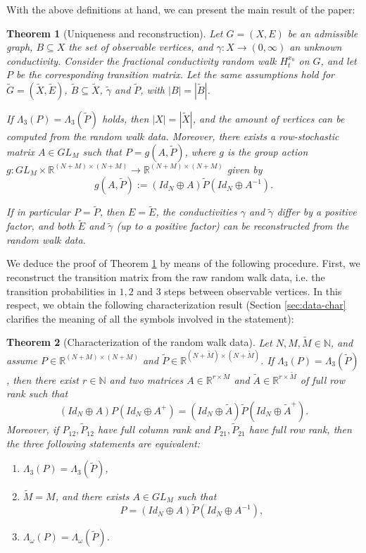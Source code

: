 \documentclass[a4paper,11pt,oneside]{amsart}
\newtheorem{theorem}{Theorem}[section]
\newcommand{\R}{{\mathbb R}}
\newcommand{\N}{{\mathbb N}}
\begin{document}
With the above definitions at hand, we can present the main result of the paper:

\begin{theorem}[Uniqueness and reconstruction]\label{th:main}
    Let $G=(X,E)$ be an admissible graph, $B\subseteq X$ the set of observable vertices, and $\gamma : X\rightarrow (0,\infty)$ an unknown conductivity. Consider the fractional conductivity random walk $H^{x_0}_t$ on $G$, and let $P$ be the corresponding transition matrix. Let the same assumptions hold for $\tilde G= (\tilde X, \tilde E)$, $\tilde B\subseteq \tilde X$, $\tilde \gamma$ and $\tilde P$, with $|B|=|\tilde B|$.
    
    If $\Lambda_3(P) = \Lambda_3(\tilde P)$ holds, then $|X|=|\tilde X|$, and the amount of vertices can be computed from the random walk data. Moreover, there exists a row-stochastic matrix $A\in GL_M$ such that $P=g(A,\tilde P)$, where $g$ is the group action $g: GL_M\times \R^{(N+M)\times (N+M)}\rightarrow \R^{(N+M)\times (N+M)}$ given by
$$ g(A,\tilde P):= (Id_N\oplus A) \tilde P (Id_N\oplus A^{-1} ). $$ 

If in particular $P=\tilde P$, then $E = \tilde E$, the conductivities $\gamma$ and $\tilde \gamma$ differ by a positive factor, and both $\tilde E$ and $\tilde \gamma$ (up to a positive factor) can be reconstructed from the random walk data.
\end{theorem}

We deduce the proof of Theorem \ref{th:main} by means of the following procedure. First, we reconstruct the transition matrix from the raw random walk data, i.e. the transition probabilities in $1,2$ and $3$ steps between observable vertices. In this respect, we obtain the following characterization result (Section \ref{sec:data-char} clarifies the meaning of all the symbols involved in the statement):

\begin{theorem}[Characterization of the random walk data]\label{characterization-new}
Let $N,M,\tilde M\in \N$, and assume $P\in \R^{(N+M)\times(N+M)}$ and $\tilde P\in \R^{(N+\tilde M)\times(N+\tilde M)}$. If $\Lambda_3(P)=\Lambda_3(\tilde P)$, then there exist $r\in\N$ and two matrices $A\in \R^{r\times M}$ and $\tilde A \in \R^{r\times \tilde M}$ of full row rank such that 
 $$(Id_N\oplus A) P (Id_N\oplus A^+) = (Id_N\oplus \tilde A) \tilde P (Id_N\oplus \tilde A^+).$$ Moreover, if $P_{12}, \tilde P_{12}$ have full column rank and $P_{21}, \tilde P_{21}$ have full row rank, then the three following statements are equivalent:
\begin{enumerate}
    \item $\Lambda_3(P)=\Lambda_3(\tilde P)$,
    \item $\tilde M = M$, and there exists $A\in GL_M$ such that
$$ P = (Id_N\oplus  A) \tilde P (Id_N\oplus  A^{-1} ),$$
    \item $\Lambda_\omega(P)=\Lambda_\omega(\tilde P)$.
\end{enumerate} 
\end{theorem}
\end{document}
